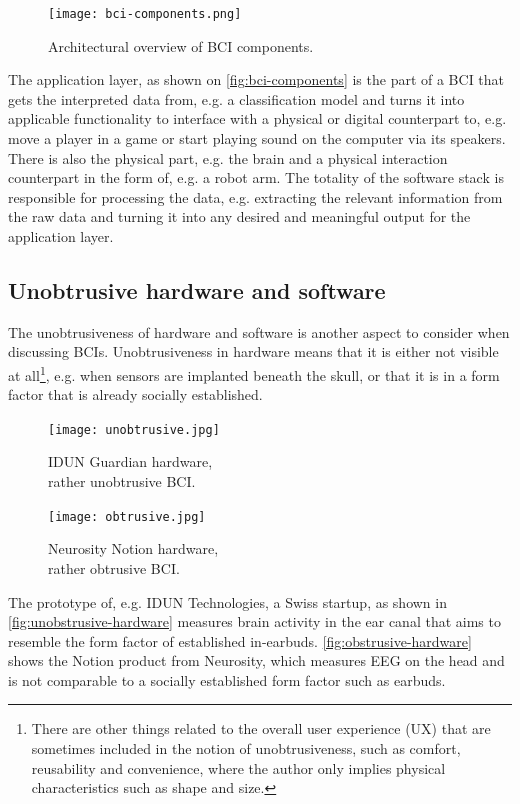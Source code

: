 \begin{figure}[!ht]
  \centering
  \texttt{[image: bci-components.png]}
  \caption{Architectural overview of BCI components.}
  \label{fig:bci-components}
\end{figure}

The application layer, as shown on \autoref{fig:bci-components} is the part of a BCI that gets the interpreted data from, e.g. a classification model and turns it into applicable functionality to interface with a physical or digital counterpart to, e.g. move a player in a game or start playing sound on the computer via its speakers. There is also the physical part, e.g. the brain and a physical interaction counterpart in the form of, e.g. a robot arm. The totality of the software stack is responsible for processing the data, e.g. extracting the relevant information from the raw data and turning it into any desired and meaningful output for the application layer.

\subsection{Unobtrusive hardware and software}
\label{chapter2-unobtrusive-hardware-and-software}

The unobtrusiveness of hardware and software is another aspect to consider when discussing BCIs. Unobtrusiveness in hardware means that it is either not visible at all\footnote{There are other things related to the overall user experience (UX) that are sometimes included in the notion of unobtrusiveness, such as comfort, reusability and convenience, where the author only implies physical characteristics such as shape and size.}, e.g. when sensors are implanted beneath the skull, or that it is in a form factor that is already socially established.

\begin{figure}[!ht]
  \texttt{[image: unobtrusive.jpg]}
  \caption{IDUN Guardian hardware, \\ rather unobtrusive BCI.}
  \label{fig:unobstrusive-hardware}
  \endminipage\hfill
  \texttt{[image: obtrusive.jpg]}
  \caption{Neurosity Notion hardware, \\ rather obtrusive BCI.}
  \label{fig:obstrusive-hardware}
  \endminipage\hfill
\end{figure}

The prototype of, e.g. IDUN Technologies, a Swiss startup, as shown in \autoref{fig:unobstrusive-hardware} measures brain activity in the ear canal that aims to resemble the form factor of established in-earbuds. \autoref{fig:obstrusive-hardware} shows the Notion product from Neurosity, which measures EEG on the head and is not comparable to a socially established form factor such as earbuds.

